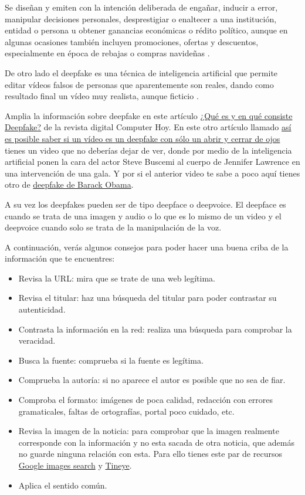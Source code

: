 \documentclass[
  a4paper,
  openany]{book}
\begin{document}
Se diseñan y emiten con la intención deliberada de engañar, inducir a error, manipular decisiones personales, desprestigiar o enaltecer a una institución, entidad o persona u obtener ganancias económicas o rédito político, aunque en algunas ocasiones también incluyen promociones, ofertas y descuentos, especialmente en época de rebajas o compras navideñas \citep{WIKI-fake-news}.

De otro lado el deepfake es una técnica de inteligencia artificial que permite editar vídeos falsos de personas que aparentemente son reales, dando como resultado final un vídeo muy realista, aunque ficticio \citep{WIKI-deepfake}.

Amplia la información sobre deepfake en este artículo \href{https://computerhoy.com/reportajes/tecnologia/consiste-deepfake-446355}{¿Qué es y en qué consiste Deepfake?} de la revista digital Computer Hoy. En este otro artículo llamado \href{https://www.xataka.com/inteligencia-artificial/posible-saber-video-deepfake-solo-abrir-cerrar-ojos-literalmente-quizas-eso-no-sea-suficiente}{así es posible saber si un vídeo es un deepfake con sólo un abrir y cerrar de ojos} tienes un video que no deberías dejar de ver, donde por medio de la inteligencia artificial ponen la cara del actor Steve Buscemi al cuerpo de Jennifer Lawrence en una intervención de una gala. Y por si el anterior video te sabe a poco aquí tienes otro de \href{https://www.youtube.com/watch?v=cQ54GDm1eL0}{deepfake de Barack Obama}.

A su vez los deepfakes pueden ser de tipo deepface o deepvoice. El deepface es cuando se trata de una imagen y audio o lo que es lo mismo de un video y el deepvoice cuando solo se trata de la manipulación de la voz.

A continuación, verás algunos consejos para poder hacer una buena criba de la información que te encuentres:

\begin{itemize}
\item
  Revisa la URL: mira que se trate de una web legítima.
\item
  Revisa el titular: haz una búsqueda del titular para poder contrastar su autenticidad.
\item
  Contrasta la información en la red: realiza una búsqueda para comprobar la veracidad.
\item
  Busca la fuente: comprueba si la fuente es legítima.
\item
  Comprueba la autoría: si no aparece el autor es posible que no sea de fiar.
\item
  Comproba el formato: imágenes de poca calidad, redacción con errores gramaticales, faltas de ortografías, portal poco cuidado, etc.
\item
  Revisa la imagen de la noticia: para comprobar que la imagen realmente corresponde con la información y no esta sacada de otra noticia, que además no guarde ninguna relación con esta. Para ello tienes este par de recursos \href{https://www.google.es/imghp?hl=es}{Google images search} y \href{https://tineye.com/}{Tineye}.
\item
  Aplica el sentido común.
\end{itemize}
\end{document}
